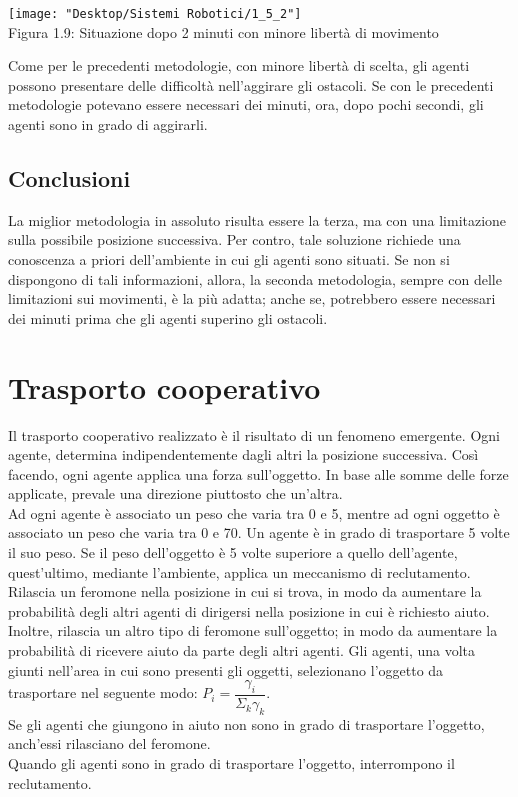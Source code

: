 \documentclass[12pt,a4paper,openright,twoside]{report}
\begin{document}
\begin{center}  
	\texttt{[image: "Desktop/Sistemi Robotici/1\_5\_2"]}
	\\Figura 1.9: Situazione dopo 2 minuti con minore libertà di movimento
\end{center}

Come per le precedenti metodologie, con minore libertà di scelta, gli agenti possono presentare delle difficoltà nell'aggirare gli ostacoli. Se con le precedenti metodologie potevano essere necessari dei minuti, ora, dopo pochi secondi, gli agenti sono in grado di aggirarli.

\subsection{Conclusioni}

La miglior metodologia in assoluto risulta essere la terza, ma con una limitazione sulla possibile posizione successiva. Per contro, tale soluzione richiede una conoscenza a priori dell'ambiente in cui gli agenti sono situati. Se non si dispongono di tali informazioni, allora, la seconda metodologia, sempre con delle limitazioni sui movimenti, è la più adatta; anche se, potrebbero essere necessari dei minuti prima che gli agenti superino gli ostacoli.

\section{Trasporto cooperativo}

Il trasporto cooperativo realizzato è il risultato di un fenomeno emergente. Ogni agente, determina indipendentemente dagli altri la posizione successiva. Così facendo, ogni agente applica una forza sull'oggetto. In base alle somme delle forze applicate, prevale una direzione piuttosto che un'altra.\\
Ad ogni agente è associato un peso che varia tra 0 e 5, mentre ad ogni oggetto è associato un peso che varia tra 0 e 70. Un agente è in grado di trasportare 5 volte il suo peso. Se il peso dell'oggetto è 5 volte superiore a quello dell'agente, quest'ultimo, mediante l'ambiente, applica un meccanismo di reclutamento. Rilascia un feromone nella posizione in cui si trova, in modo da aumentare la probabilità degli altri agenti di dirigersi nella posizione in cui è richiesto aiuto. Inoltre, rilascia un altro tipo di feromone sull'oggetto; in modo da aumentare la probabilità di ricevere aiuto da parte degli altri agenti. Gli agenti, una volta giunti nell'area in cui sono presenti gli oggetti, selezionano l'oggetto da trasportare nel seguente modo: $P_i =\dfrac{\gamma_i}{\Sigma_k \gamma_k}$.\\ Se gli agenti che giungono in aiuto non sono in grado di trasportare l'oggetto, anch'essi rilasciano del feromone.\\
Quando gli agenti sono in grado di trasportare l'oggetto, interrompono il reclutamento.
\end{document}
